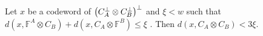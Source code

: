 %
%   
%
% 
 \begin{claim}  
   \label{claim:close}
   Let $x$ be a codeword of $\left( C_{A}^{\perp}\otimes C_{B}^{\perp} \right)^{\perp}$ and $\xi < w$ such that $d(x, \mathbb{F}^{A} \otimes C_{B}) + d(x, C_{A}\otimes\mathbb{F}^{B}) \le \xi $ . Then $d(x, C_{A} \otimes C_{B}) < 3\xi $. 
 \end{claim} 
